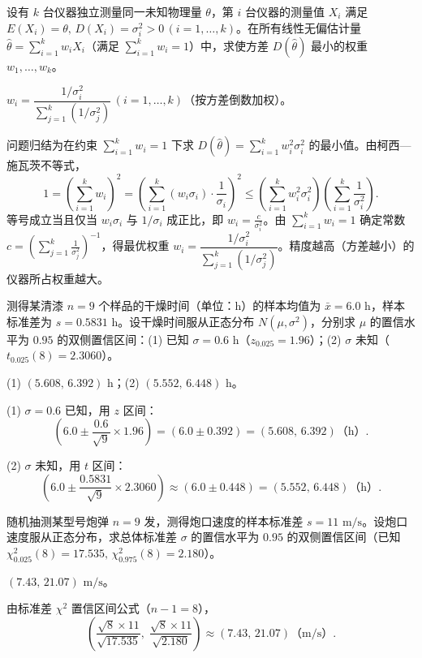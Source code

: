 \begin{exercise}
设有 $k$ 台仪器独立测量同一未知物理量 $\theta$，第 $i$ 台仪器的测量值 $X_i$ 满足 $E(X_i)=\theta,\,D(X_i)=\sigma_i^2>0\,(i=1,\ldots,k)$。在所有线性无偏估计量 $\hat{\theta}=\sum_{i=1}^{k}w_i X_i$（满足 $\sum_{i=1}^{k}w_i=1$）中，求使方差 $D(\hat{\theta})$ 最小的权重 $w_1,\ldots,w_k$。
\begin{answer}
$w_i=\dfrac{1/\sigma_i^2}{\sum_{j=1}^{k}(1/\sigma_j^2)}\,(i=1,\ldots,k)$（按方差倒数加权）。
\end{answer}
\begin{solution}
问题归结为在约束 $\sum_{i=1}^{k}w_i=1$ 下求 $D(\hat{\theta})=\sum_{i=1}^{k}w_i^2\sigma_i^2$ 的最小值。由柯西—施瓦茨不等式，
\[
  1=\left(\sum_{i=1}^{k}w_i\right)^2
  =\left(\sum_{i=1}^{k}(w_i\sigma_i)\cdot\frac{1}{\sigma_i}\right)^2
  \le\left(\sum_{i=1}^{k}w_i^2\sigma_i^2\right)\left(\sum_{i=1}^{k}\frac{1}{\sigma_i^2}\right).
\]
等号成立当且仅当 $w_i\sigma_i$ 与 $1/\sigma_i$ 成正比，即 $w_i=\frac{c}{\sigma_i^2}$。由 $\sum_{i=1}^{k}w_i=1$ 确定常数 $c=\left(\sum_{j=1}^{k}\frac{1}{\sigma_j^2}\right)^{-1}$，得最优权重 $w_i=\dfrac{1/\sigma_i^2}{\sum_{j=1}^{k}(1/\sigma_j^2)}$。精度越高（方差越小）的仪器所占权重越大。
\end{solution}
\end{exercise}

\begin{exercise}
测得某清漆 $n=9$ 个样品的干燥时间（单位：$\mathrm{h}$）的样本均值为 $\bar{x}=6.0\text{ h}$，样本标准差为 $s=0.5831\text{ h}$。设干燥时间服从正态分布 $N(\mu,\sigma^2)$，分别求 $\mu$ 的置信水平为 $0.95$ 的双侧置信区间：(1) 已知 $\sigma=0.6\text{ h}$（$z_{0.025}=1.96$）；(2) $\sigma$ 未知（$t_{0.025}(8)=2.3060$）。
\begin{answer}
(1) $(5.608,\,6.392)\text{ h}$；(2) $(5.552,\,6.448)\text{ h}$。
\end{answer}
\begin{solution}
(1) $\sigma=0.6$ 已知，用 $z$ 区间：
\[
  \left(6.0\pm\frac{0.6}{\sqrt{9}}\times 1.96\right)=(6.0\pm 0.392)=(5.608,\,6.392)\text{（h）}.
\]

(2) $\sigma$ 未知，用 $t$ 区间：
\[
  \left(6.0\pm\frac{0.5831}{\sqrt{9}}\times 2.3060\right)\approx(6.0\pm 0.448)=(5.552,\,6.448)\text{（h）}.
\]
\end{solution}
\end{exercise}

\begin{exercise}
随机抽测某型号炮弹 $n=9$ 发，测得炮口速度的样本标准差 $s=11\text{ m/s}$。设炮口速度服从正态分布，求总体标准差 $\sigma$ 的置信水平为 $0.95$ 的双侧置信区间（已知 $\chi_{0.025}^2(8)=17.535,\,\chi_{0.975}^2(8)=2.180$）。
\begin{answer}
$(7.43,\,21.07)\text{ m/s}$。
\end{answer}
\begin{solution}
由标准差 $\chi^2$ 置信区间公式（$n-1=8$），
\[
  \left(\frac{\sqrt{8}\times 11}{\sqrt{17.535}},\;\frac{\sqrt{8}\times 11}{\sqrt{2.180}}\right)
  \approx(7.43,\,21.07)\text{（m/s）}.
\]
\end{solution}
\end{exercise}

